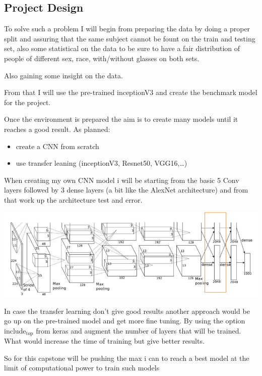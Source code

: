 \documentclass[11pt]{article}
\begin{document}
\subsection{Project Design}
\label{sec:org190fc9a}


To solve such a problem I will begin from preparing the data by doing a
proper split and assuring that the same subject cannot be fount on the train
and testing set, also some statistical on the data to be sure to have a fair
distribution of people of different sex, race, with/without glasses on both
sets.

Also gaining some insight on the data.

From that I will use the pre-trained inceptionV3 and create the benchmark
model for the project.

Once the environment is prepared the aim is to create many models until it
reaches a good result. 
As planned:

\begin{itemize}
\item create a CNN from scratch
\item use transfer leaning (inceptionV3, Resnet50, VGG16,\ldots{})
\end{itemize}

When creating my own CNN model i will be starting from the basic 5 Conv
layers followed by 3 dense layers (a bit like the AlexNet architecture) and from that work up the architecture test
and error.  

\begin{center}
\includegraphics[width=.9\linewidth]{./images/alexnet6.jpg}
\end{center}

In case the transfer learning don't give good results another approach would
be go up on the pre-trained model and get more fine tuning.
By using the option include\(_{\text{top}}\) from keras and augment the number of layers
that will be trained. What would increase the time of training but give better results.

So for this capstone will be pushing the max i can to reach a best model at
the limit of computational power to train such models








\end{document}
